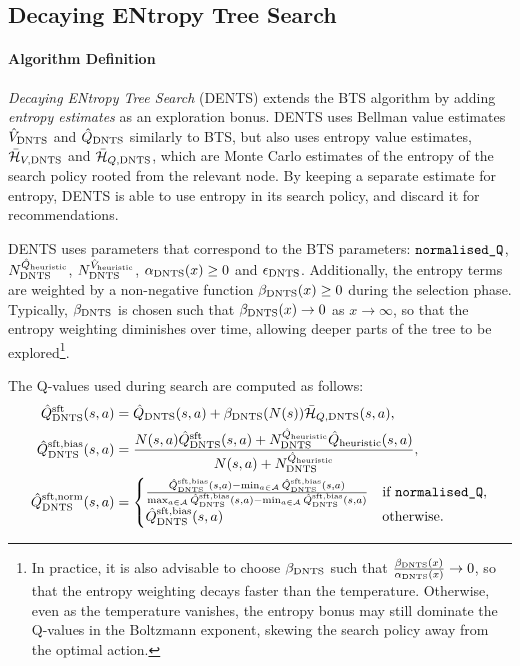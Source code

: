 \subsection{Decaying ENtropy Tree Search}
\label{sec:4-2-2-dents}

    \paragraph{Algorithm Definition}

    \textit{Decaying ENtropy Tree Search} (DENTS) extends the BTS algorithm by adding \textit{entropy estimates} as an exploration bonus. DENTS uses Bellman value estimates $\Vdents$ and $\Qdents$ similarly to BTS, but also uses entropy value estimates, $\HVdents$ and $\HQdents$, which are Monte Carlo estimates of the entropy of the search policy rooted from the relevant node. By keeping a separate estimate for entropy, DENTS is able to use entropy in its search policy, and discard it for recommendations.

    DENTS uses parameters that correspond to the BTS parameters: $\normalisedq$, $\Nqdents$, $\Nvdents$, \mbox{$\alphadents(x)\geq 0$} and $\epsdents$. Additionally, the entropy terms are weighted by a non-negative function $\betadents(x)\geq 0$ during the selection phase. Typically, $\betadents$ is chosen such that $\betadents(x)\rightarrow 0$ as $x\rightarrow\infty$, so that the entropy weighting diminishes over time, allowing deeper parts of the tree to be explored\footnote{In practice, it is also advisable to choose $\betadents$ such that $\frac{\betadents(x)}{\alphadents(x)}\rightarrow 0$, so that the entropy weighting decays faster than the temperature. Otherwise, even as the temperature vanishes, the entropy bonus may still dominate the Q-values in the Boltzmann exponent, skewing the search policy away from the optimal action.}.
    
    The Q-values used during search are computed as follows:
    \begin{align}
        \Qdentssoft(s,a) &= \Qdents(s,a)+\betadents(N(s))\HQdents(s,a), \\
        \Qdentsbias(s,a) &= \frac{N(s,a) \Qdentssoft(s,a) +  \Nqdents \Qinit(s,a)}{N(s,a)+\Nqdents}, \\
        \Qdentsnorm(s,a) &= 
        \begin{cases}
            \frac{\Qdentsbias(s,a)-\min_{a\in\cl{A}}\Qdentsbias(s,a)}{\max_{a\in\cl{A}}\Qdentsbias(s,a)-\min_{a\in\cl{A}}\Qdentsbias(s,a)} & \text{if } \normalisedq, \\
            \Qdentsbias(s,a) & \text{otherwise.}
        \end{cases}
    \end{align}


